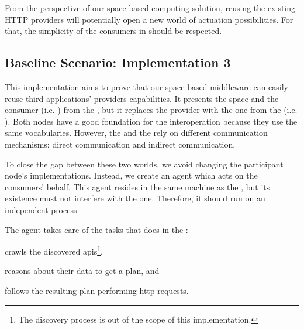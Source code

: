 From the perspective of our space-based computing solution, reusing the existing HTTP providers will potentially open a new world of actuation possibilities.
For that, the simplicity of the consumers in \spaceActuation{} should be respected. %




\subsection{Baseline Scenario: Implementation 3}
\label{sec:actuation_scn3}
\newcommand{\implMix}{\emph{Implementation 3}}

This implementation aims to prove that our space-based middleware can easily reuse third applications' providers capabilities. %
It presents the space and the consumer (i.e. \nodeConsSpace{}) from the \implSpace{}, but it replaces the provider with the one from the \implRest{} (i.e. \nodeProvRest{}).
Both nodes have a good foundation for the interoperation because they use the same vocabularies. %
However, the \nodeProvRest{} and the \nodeConsSpace{} rely on different communication mechanisms: direct communication and indirect communication.


To close the gap between these two worlds, we avoid changing the participant node's implementations.
Instead, we create an agent which acts on the consumers' behalf. %
This agent resides in the same machine as the \Space{}, but its existence must not interfere with the \Space{} one. %
Therefore, it should run on an independent process.


The agent takes care of the tasks that \nodeConsRest{} does in the \implRest:
\begin{enumerate*}[label=\itshape(\arabic*\upshape)]
  \item crawls the discovered \acsp{api}\footnote{The discovery process is out of the scope of this implementation.},
  \item reasons about their data to get a plan, and
  \item follows the resulting plan performing \acs{http} requests.
\end{enumerate*}


